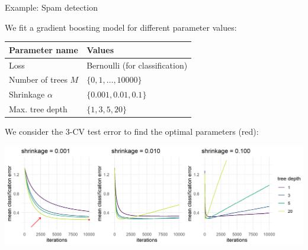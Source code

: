 \begin{vbframe}{Example: Spam detection}







%

We fit a gradient boosting model for different parameter values:

\begin{table}[]
\footnotesize
\centering
\begin{tabular}{l|l}
Parameter name      & Values                         \\
\hline
Loss        & Bernoulli (for classification) \\
Number of trees $M$ & $\{0, 1,\dots,10000\}$              \\
Shrinkage $\alpha$     & $\{0.001, 0.01, 0.1\}$           \\
Max. tree depth     & $\{1, 3, 5, 20\}$
\end{tabular}
\end{table}

\vfill
We consider the 3-CV test error to find the optimal parameters (red):




\begin{center}
\includegraphics[width=\textwidth]{figure/gbm_spam.png}
\end{center}


\end{vbframe}

